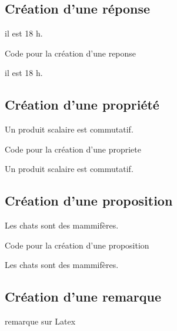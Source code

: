 {\subsection{Création d'une réponse}

\begin{reponse}
    il est 18 h.
\end{reponse}

\begin{Latex}{Code pour la création d'une reponse}
\begin{reponse}
    il est 18 h.
\end{reponse}
\end{Latex}

\subsection{Création d'une propriété}

\begin{propriete}
    Un produit scalaire est commutatif.
\end{propriete}

\begin{Latex}{Code pour la création d'une propriete}
\begin{propriete}
    Un produit scalaire est commutatif.
\end{propriete}
\end{Latex}

\subsection{Création d'une proposition}

\begin{proposition}
    Les chats sont des mammifères.
\end{proposition}

\begin{Latex}{Code pour la création d'une proposition}
\begin{proposition}
    Les chats sont des mammifères.
\end{proposition}
\end{Latex}

\subsection{Création d'une remarque}

\begin{remarque}
remarque sur Latex
\end{remarque}

}
